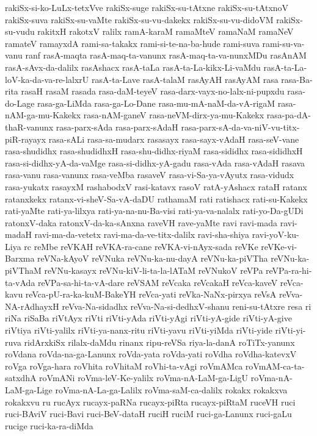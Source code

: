 {rakiSx-si-ko-LuLx-tetxVve
rakiSx-suge
rakiSx-su-tAtxne
rakiSx-su-tAtxnoV
rakiSx-suva
rakiSx-su-vaMte
rakiSx-su-vu-dakekx
rakiSx-su-vu-didoVM
rakiSx-su-vudu
rakitxH
rakotxV
ralilx
ramA-karaM
ramaMteV
ramaNaM
ramaNeV
ramateV
ramayxdA
rami-sa-takakx
rami-si-te-na-ba-hude
rami-suva
rami-su-va-vanu
ranf
rasA-maqta
rasA-maq-ta-vanunx
rasA-maq-ta-va-nunxMDu
rasAnAM
rasA-sAvx-da-dalilx
rasAshacx
rasA-taLa
rasA-ta-La-kikx-Li-vaMdu
rasA-ta-La-loV-ka-da-va-re-lalxrU
rasA-ta-Lave
rasA-talaM
rasAyAH
rasAyAM
rasa
rasa-Ba-rita
rasaH
rasaM
rasada
rasa-daM-teyeV
rasa-darx-vayx-no-lalx-ni-pupxdu
rasa-do-Lage
rasa-ga-LiMda
rasa-ga-Lo-Dane
rasa-mu-mA-naM-da-vA-rigaM
rasa-nAM-ga-mu-Kakekx
rasa-nAM-ganeV
rasa-neVM-dirx-ya-mu-Kakekx
rasa-pa-dA-thaR-vanunx
rasa-parx-sAda
rasa-parx-sAdaH
rasa-parx-sA-da-va-niV-vu-titx-piR-rayayx
rasa-sALi
rasa-sa-mudarx
rasasayx
rasa-sayx-vAdaH
rasa-seV-vane
rasa-shudidhx
rasa-shudidhxH
rasa-shu-didhx-riyaM
rasa-sididhx
rasa-sididhxH
rasa-si-didhx-yA-da-vaMge
rasa-si-didhx-yA-gadu
rasa-vAda
rasa-vAdaH
rasava
rasa-vanu
rasa-vanunx
rasa-veMba
rasaveV
rasa-vi-Sa-ya-vAyutx
rasa-vidudx
rasa-yukatx
rasayxM
rashabodxV
rasi-katavx
rasoV
ratA-yAshacx
rataH
ratanx
ratanxkekx
ratanx-vi-sheV-Sa-vA-daDU
rathamaM
rati
ratishacx
rati-su-Kakekx
rati-yaMte
rati-ya-lilxya
rati-ya-na-nu-Ba-visi
rati-ya-va-nalalx
rati-yo-Da-gUDi
ratonxV-daka
ratonxV-da-ka-sAnxna
raveVH
rave-yaMte
ravi
ravi-mada
ravi-madaH
ravi-ma-da-vetetx
ravi-ma-da-ve-titx-dalilx
ravi-sha-shiya
ravi-yoV-ku-Liya
rc
reMbe
reVKAH
reVKA-ra-cane
reVKA-vi-nAyx-sada
reVKe
reVKe-vi-Barxma
reVNa-kAyoV
reVNuka
reVNu-ka-nu-dayA
reVNu-ka-piVTha
reVNu-ka-piVThaM
reVNu-kasayx
reVNu-kiV-li-ta-la-lATaM
reVNukoV
reVPa
reVPa-ra-hi-ta-vAda
reVPa-sa-hi-ta-vA-dare
reVSAM
reVcaka
reVcakaH
reVca-kaveV
reVca-kavu
reVca-pU-ra-ka-kuM-BakeYH
reVca-yati
reVka-NaNx-pirxya
reVsA
reVva-NA-rAdhayxH
reVva-Na-sidadhx
reVva-Na-si-dedhxV-shanu
reni-su-tAtxre
resa
ri
riNa
riSaBa
riVtAyx
riVti
riVti-yAda
riVti-yAgi
riVti-yA-gide
riVti-yA-give
riVtiya
riVti-yalilx
riVti-ya-nanx-ritu
riVti-yavu
riVti-yiMda
riVti-yide
riVti-yi-ruva
ridArxkiSx
rilalx-daMdu
rinanx
ripu-reVSa
riya-la-danA
roTiTx-yanunx
roVdana
roVda-na-ga-Lanunx
roVda-yata
roVda-yati
roVdha
roVdha-katevxV
roVga
roVga-hara
roVhita
roVhitaM
roVhi-ta-vAgi
roVmAMca
roVmAM-ca-ta-satxdhA
roVmANi
roVma-leV-Ke-yalilx
roVma-nA-LaM-ga-LigU
roVma-nA-LaM-ga-Lige
roVma-nA-La-ga-Lalilx
roVma-saM-ca-dalilx
rokakx
rokakxva
rokakxvu
ru
rucAyx
rucayx-paRNa
rucayx-piRta
rucayx-piRtaM
ruceVH
ruci
ruci-BAviV
ruci-Bavi
ruci-BeV-dataH
ruciH
ruciM
ruci-ga-Lanunx
ruci-gaLu
rucige
ruci-ka-ra-diMda
}
